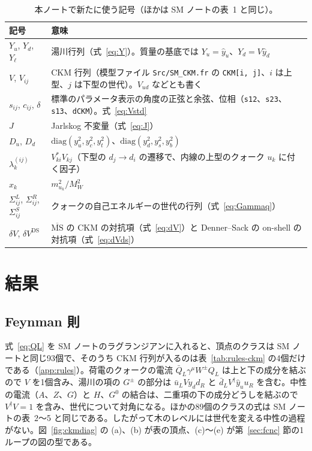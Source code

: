 \documentclass[a4paper,10pt]{ltjsarticle}
\newcommand{\MSbar}{\overline{\mathrm{MS}}}
\begin{document}
\begin{table}[tbp]
\centering\small
\caption{本ノートで新たに使う記号（ほかは SM ノートの表~1 と同じ）。}
\label{tab:notation}
\begin{tabularx}{\linewidth}{>{\raggedright\arraybackslash}p{4.1cm}X}
\toprule
\textbf{記号} & \textbf{意味} \\
\midrule
$Y_u$, $Y_d$, $Y_\ell$ & 湯川行列（式~\eqref{eq:Y}）。質量の基底では $Y_u=\hat y_u$、$Y_d=V\hat y_d$ \\
$V$, $V_{ij}$ & CKM 行列（模型ファイル \texttt{Src/SM\_CKM.fr} の \texttt{CKM[i, j]}、$i$ は上型、$j$ は下型の世代）。$V_{ud}$ などとも書く \\
$s_{ij}$, $c_{ij}$, $\delta$ & 標準のパラメータ表示の角度の正弦と余弦、位相（\texttt{s12}、\texttt{s23}、\texttt{s13}、\texttt{dCKM}）。式~\eqref{eq:Vstd} \\
$J$ & Jarlskog 不変量（式~\eqref{eq:J}） \\
$D_u$, $D_d$ & $\mathrm{diag}(y_u^2,y_c^2,y_t^2)$、$\mathrm{diag}(y_d^2,y_s^2,y_b^2)$ \\
$\lambda^{(ij)}_k$ & $V_{ki}^*V_{kj}$（下型の $d_j\to d_i$ の遷移で、内線の上型のクォーク $u_k$ に付く因子） \\
$x_k$ & $m_{u_k}^2/M_W^2$ \\
$\Sigma^L_{ij}$, $\Sigma^R_{ij}$, $\Sigma^S_{ij}$ & クォークの自己エネルギーの世代の行列（式~\eqref{eq:Gammaq}） \\
$\delta V$, $\delta V^{\mathrm{DS}}$ & $\MSbar$ の CKM の対抗項（式~\eqref{eq:dV}）と Denner--Sack の on-shell の対抗項（式~\eqref{eq:dVds}） \\
\bottomrule
\end{tabularx}
\end{table}

\section{結果}\label{sec:results}

\subsection{Feynman 則}\label{sec:rules}

式~\eqref{eq:QL} を SM ノートのラグランジアンに入れると、頂点のクラスは SM ノートと同じ93個で、そのうち CKM 行列が入るのは表~\ref{tab:rules-ckm} の4個だけである（\ref{app:rules}）。荷電のクォークの電流 $\bar Q_L\gamma^\mu W^\pm Q_L$ は上と下の成分を結ぶので $V$ を1個含み、湯川の項の $G^\pm$ の部分は $\bar u_LV\hat y_dd_R$ と $\bar d_LV^\dagger\hat y_uu_R$ を含む。中性の電流（$A$、$Z$、$G$）と $H$、$G^0$ の結合は、二重項の下の成分どうしを結ぶので $V^\dagger V=1$ を含み、世代について対角になる。ほかの89個のクラスの式は SM ノートの表~2〜5 と同じである。したがって木のレベルには世代を変える中性の過程がない。図~\ref{fig:ckmdiag} の (a)、(b) が表の頂点、(c)〜(e) が第~\ref{sec:fcnc} 節の1ループの図の型である。
\end{document}
